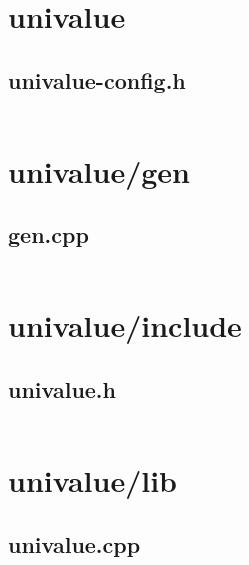 \documentclass{article}
\begin{document}


\section{univalue}

\subsection{univalue-config.h}
\inputminted{cpp}{/home/dufferzafar/dev/@clones/bitcoin/src/univalue/univalue-config.h}
\newpage

\section{univalue/gen}

\subsection{gen.cpp}
\inputminted{cpp}{/home/dufferzafar/dev/@clones/bitcoin/src/univalue/gen/gen.cpp}
\newpage

\section{univalue/include}

\subsection{univalue.h}
\inputminted{cpp}{/home/dufferzafar/dev/@clones/bitcoin/src/univalue/include/univalue.h}
\newpage

\section{univalue/lib}

\subsection{univalue.cpp}
\inputminted{cpp}{/home/dufferzafar/dev/@clones/bitcoin/src/univalue/lib/univalue.cpp}
\newpage
\end{document}

